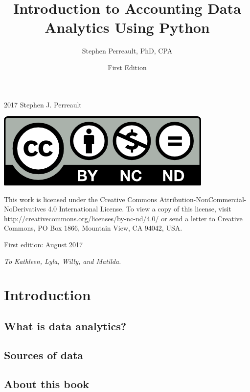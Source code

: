 \documentclass{book}
\begin{document}
\frontmatter
\pagestyle{plain}
\begin{titlepage}
	\title {\huge \textbf{Introduction to Accounting Data Analytics Using Python}}
	\date{First Edition}
	\author{Stephen Perreault, PhD, CPA}
	\maketitle
\end{titlepage}
\begingroup
	\parindent 0pt
	\parskip \baselineskip 
	\textcopyright{} 2017 Stephen J. Perreault 
	
	\begin {center}
	\includegraphics  [scale=1.5]{creative_commons_license}
	\end {center}
	
	This work is licensed under the Creative Commons Attribution-NonCommercial-NoDerivatives 4.0 International License. To view a copy of this license, visit http://creativecommons.org/licenses/by-nc-nd/4.0/ or send a letter to Creative Commons, PO Box 1866, Mountain View, CA 94042, USA.
	
	First edition: August 2017
\endgroup
\tableofcontents

\begin {center}
\newpage
\textit{
To Kathleen, Lyla, Willy, and Matilda.}
\end {center}

\mainmatter	
\parindent 0pt
\parskip \baselineskip 

\chapter{Introduction}
\section{What is data analytics?}
\section{Sources of data}
\section{About this book}
\end{document}

